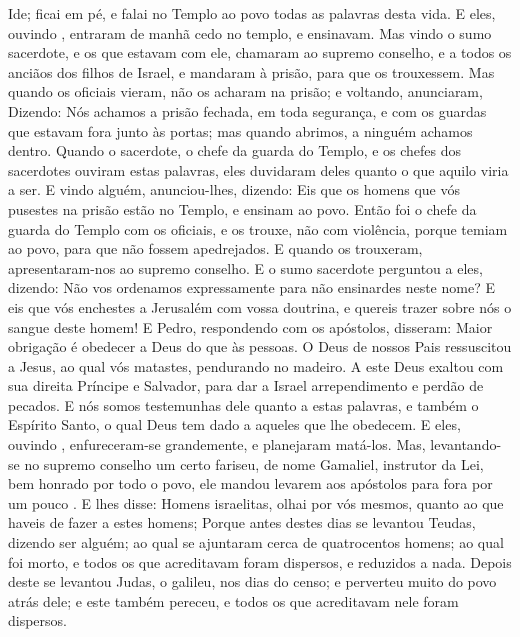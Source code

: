 {Ide; ficai em pé, e falai no Templo ao povo todas as palavras desta vida.
E eles, ouvindo
{} , entraram de manhã cedo no templo, e ensinavam. Mas vindo o sumo sacerdote, e os que estavam com ele, chamaram ao supremo conselho,
 e a todos os anciãos dos filhos de Israel, e mandaram à prisão, para que os trouxessem.
Mas quando os oficiais vieram, não os acharam na prisão; e voltando, anunciaram,
Dizendo: Nós achamos a prisão fechada, em toda segurança, e com os guardas que estavam fora junto às portas; mas quando
{} abrimos, a ninguém achamos dentro.
Quando o
{} sacerdote, o chefe da guarda do Templo, e os chefes dos sacerdotes ouviram estas palavras, eles duvidaram deles quanto o que aquilo viria a ser.
E vindo alguém, anunciou-lhes, dizendo: Eis que os homens que vós pusestes na prisão estão no Templo, e ensinam ao povo.
Então foi o chefe da guarda do Templo com os oficiais, e os trouxe,
{} não com violência, porque temiam ao povo, para que não fossem apedrejados.
E quando os trouxeram, apresentaram-nos ao supremo conselho. E o sumo sacerdote perguntou a eles, dizendo:
Não vos ordenamos expressamente para não ensinardes
{} neste nome? E eis que vós enchestes a Jerusalém com vossa doutrina, e quereis trazer sobre nós o sangue deste homem!
E Pedro, respondendo com os apóstolos, disseram: Maior obrigação é obedecer a Deus do que às pessoas.
O Deus de nossos Pais ressuscitou a Jesus, ao qual vós matastes, pendurando
{} no madeiro.
A este Deus exaltou com sua
{} direita
{} Príncipe e Salvador, para dar a Israel arrependimento e perdão de pecados.
E nós somos testemunhas dele quanto a estas palavras, e também o Espírito Santo, o qual Deus tem dado a aqueles que lhe obedecem.
E eles, ouvindo
{} , enfureceram-se grandemente, e planejaram matá-los.
Mas, levantando-se no supremo conselho um certo fariseu, de nome Gamaliel, instrutor da Lei, bem honrado por todo o povo, ele mandou levarem aos apóstolos para fora por um pouco
{} .
E lhes disse: Homens israelitas, olhai por vós mesmos, quanto ao que haveis de fazer a estes homens;
Porque antes destes dias se levantou Teudas, dizendo ser alguém; ao qual se ajuntaram cerca de quatrocentos homens; ao qual foi morto, e todos os que acreditavam
{} foram dispersos, e reduzidos a nada.
Depois deste se levantou Judas, o galileu, nos dias do censo; e perverteu muito do povo atrás dele; e este também pereceu, e todos os que acreditavam nele foram dispersos.
}
